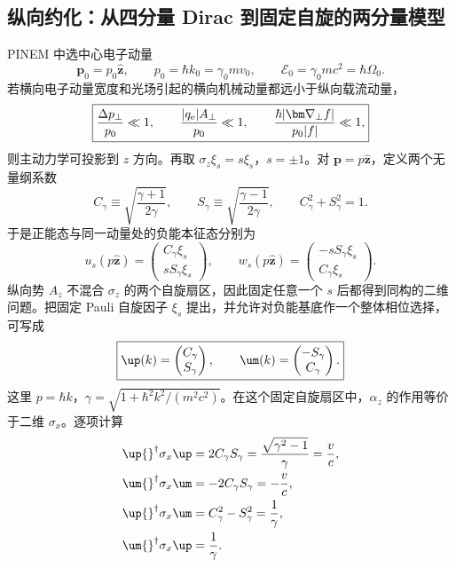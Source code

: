 \subsection{纵向约化：从四分量 Dirac 到固定自旋的两分量模型}
PINEM 中选中心电子动量
\begin{equation}
 \bm p_0=p_0\hat{\bm z},
 \qquad
 p_0=\hbar k_0=\gamma_0mv_0,
 \qquad
 \mathcal E_0=\gamma_0mc^2=\hbar\Omega_0.
\end{equation}
若横向电子动量宽度和光场引起的横向机械动量都远小于纵向载流动量，
\begin{equation}
 \boxed{
 \frac{\Delta p_\perp}{p_0}\ll1,
 \qquad
 \frac{|q_{\rm e}|A_\perp}{p_0}\ll1,
 \qquad
 \frac{\hbar|\bm\nabla_\perp f|}{p_0|f|}\ll1,}
 \label{eq:longitudinal-reduction-condition}
\end{equation}
则主动力学可投影到 $z$ 方向。再取 $\sigma_z\xi_s=s\xi_s$，$s=\pm1$。对 $\bm p=p\hat{\bm z}$，定义两个无量纲系数
\begin{equation}
 C_\gamma\equiv\sqrt{\frac{\gamma+1}{2\gamma}},
 \qquad
 S_\gamma\equiv\sqrt{\frac{\gamma-1}{2\gamma}},
 \qquad
 C_\gamma^2+S_\gamma^2=1.
 \label{eq:CG-SG}
\end{equation}
于是正能态与同一动量处的负能本征态分别为
\begin{equation}
 u_s(p\hat{\bm z})=
 \begin{pmatrix}
 C_\gamma\xi_s\\ sS_\gamma\xi_s
 \end{pmatrix},
 \qquad
 w_s(p\hat{\bm z})=
 \begin{pmatrix}
 -sS_\gamma\xi_s\\ C_\gamma\xi_s
 \end{pmatrix}.
 \label{eq:longitudinal-fourspinors}
\end{equation}
纵向势 $A_z$ 不混合 $\sigma_z$ 的两个自旋扇区，因此固定任意一个 $s$ 后都得到同构的二维问题。把固定 Pauli 自旋因子 $\xi_s$ 提出，并允许对负能基底作一个整体相位选择，可写成
\begin{equation}
 \boxed{
 \up(k)=
 \begin{pmatrix}
 C_\gamma\\ S_\gamma
 \end{pmatrix},
 \qquad
 \um(k)=
 \begin{pmatrix}
 -S_\gamma\\ C_\gamma
 \end{pmatrix}.}
 \label{eq:uplus}
\end{equation}
这里 $p=\hbar k$，$\gamma=\sqrt{1+\hbar^2k^2/(m^2c^2)}$。在这个固定自旋扇区中，$\alpha_z$ 的作用等价于二维 $\sigma_x$。逐项计算
\begin{align}
 \up{}^\dagger\sigma_x\up
 &=2C_\gamma S_\gamma
 =\frac{\sqrt{\gamma^2-1}}{\gamma}
 =\frac{v}{c},\\
 \um{}^\dagger\sigma_x\um
 &=-2C_\gamma S_\gamma=-\frac{v}{c},\\
 \up{}^\dagger\sigma_x\um
 &=C_\gamma^2-S_\gamma^2=\frac1\gamma,\\
 \um{}^\dagger\sigma_x\up&=\frac1\gamma.
 \label{eq:sigmax-matrix-elements}
\end{align}

